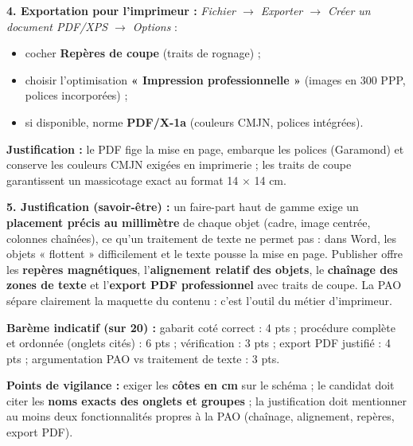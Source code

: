 \documentclass[11pt]{article}
\begin{document}
\begin{corrige}
\textbf{4. Exportation pour l'imprimeur :} \textit{Fichier $\rightarrow$ Exporter $\rightarrow$ Créer un document PDF/XPS $\rightarrow$ Options} :
\begin{itemize}
    \item cocher \textbf{Repères de coupe} (traits de rognage) ;
    \item choisir l'optimisation \textbf{« Impression professionnelle »} (images en 300 PPP, polices incorporées) ;
    \item si disponible, norme \textbf{PDF/X-1a} (couleurs CMJN, polices intégrées).
\end{itemize}
\textbf{Justification :} le PDF fige la mise en page, embarque les polices (Garamond) et conserve les couleurs CMJN exigées en imprimerie ; les traits de coupe garantissent un massicotage exact au format 14 $\times$ 14 cm.

\textbf{5. Justification (savoir-être) :} un faire-part haut de gamme exige un \textbf{placement précis au millimètre} de chaque objet (cadre, image centrée, colonnes chaînées), ce qu'un traitement de texte ne permet pas : dans Word, les objets « flottent » difficilement et le texte pousse la mise en page. Publisher offre les \textbf{repères magnétiques}, l'\textbf{alignement relatif des objets}, le \textbf{chaînage des zones de texte} et l'\textbf{export PDF professionnel} avec traits de coupe. La PAO sépare clairement la maquette du contenu : c'est l'outil du métier d'imprimeur.

\textbf{Barème indicatif (sur 20) :} gabarit coté correct : 4 pts ; procédure complète et ordonnée (onglets cités) : 6 pts ; vérification : 3 pts ; export PDF justifié : 4 pts ; argumentation PAO vs traitement de texte : 3 pts.

\textbf{Points de vigilance :} exiger les \textbf{côtes en cm} sur le schéma ; le candidat doit citer les \textbf{noms exacts des onglets et groupes} ; la justification doit mentionner au moins deux fonctionnalités propres à la PAO (chaînage, alignement, repères, export PDF).
\end{corrige}
\end{document}
